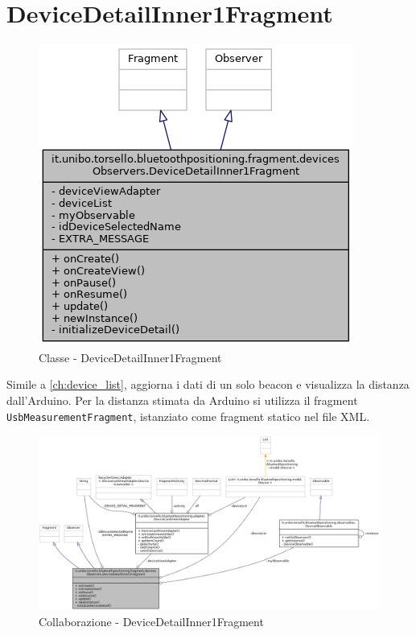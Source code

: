 \section{DeviceDetailInner1Fragment}
\begin{figure}[ph]
	\centering
	\includegraphics[width=0.5\linewidth]{img/uml/class/classit_1_1unibo_1_1torsello_1_1bluetoothpositioning_1_1fragment_1_1devicesObservers_1_1DeviceDe8362efa0b556f228cc3338a27b7e447c.png}
	\caption{Classe - DeviceDetailInner1Fragment}
\end{figure}

Simile a \ref{ch:device_list}, aggiorna i dati di un solo beacon e visualizza la distanza dall'Arduino. Per la distanza stimata da Arduino si utilizza il fragment \texttt{UsbMeasurementFragment}, istanziato come fragment statico nel file XML.

\begin{figure}[ph]
	\centering
	\includegraphics[width=1.8\linewidth,angle=90]{img/uml/class/classit_1_1unibo_1_1torsello_1_1bluetoothpositioning_1_1fragment_1_1devicesObservers_1_1DeviceDetailInner1Fragment__coll__graph.png}
	\caption{Collaborazione - DeviceDetailInner1Fragment}
\end{figure}

\newpage
